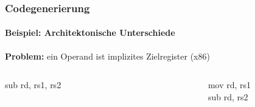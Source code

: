 \begin{frame}
	\frametitle{Codegenerierung}
	\framesubtitle{Beispiel: Architektonische Unterschiede}
	
	\textbf{Problem:} ein Operand ist implizites Zielregister (x86)
	
	\vspace{2cm}
	
	\begin{columns}[onlytextwidth]
		\ttfamily
		\begin{column}{0.45\textwidth}
			\centering
			sub rd, rs1, rs2
		\end{column}
		
		\begin{column}{0.05\textwidth}
			\centering
			\conclude
		\end{column}
		
		\begin{column}{0.45\textwidth}
			\centering
			mov rd, rs1\\
			sub rd, rs2
		\end{column}
	\end{columns}
\end{frame}

